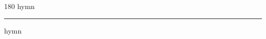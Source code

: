 
\begin{frame}
\begin{center}
\begin{turn}{180}
{\fontsize{2.5cm}{1em}\selectfont hymn}
\end{turn}
\vspace{1em}\par  
\hrule
\vspace{1em}\par  
{\fontsize{2.5cm}{1em}\selectfont hymn}
\end{center}
\end{frame}
